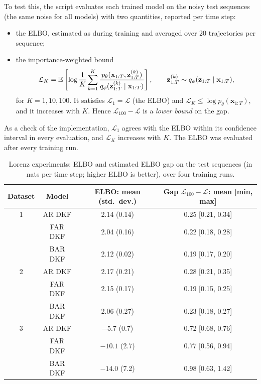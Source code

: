 To test this, the script  evaluates each trained
model on the noisy test sequences (the same noise for all models) with
two quantities, reported per time step:
\begin{itemize}
    \item the ELBO, estimated as during training and averaged over 20
    trajectories per sequence;
    \item the importance-weighted bound \cite{burda2016importance}
    \begin{equation*}
        \mathcal{L}_K = \mathbb{E}\left[\log \frac{1}{K} \sum_{k=1}^{K}
        \frac{p_\theta(\mathbf{x}_{1:T}, \mathbf{z}^{(k)}_{1:T})}
        {q_\phi(\mathbf{z}^{(k)}_{1:T} \mid \mathbf{x}_{1:T})}\right],
        \qquad \mathbf{z}^{(k)}_{1:T} \sim q_\phi(\mathbf{z}_{1:T} \mid
        \mathbf{x}_{1:T}),
    \end{equation*}
    for $K = 1, 10, 100$. It satisfies $\mathcal{L}_1 = \mathcal{L}$
    (the ELBO) and $\mathcal{L}_K \leq \log p_\theta(\mathbf{x}_{1:T})$,
    and it increases with $K$. Hence $\mathcal{L}_{100} - \mathcal{L}$ is
    a \emph{lower bound} on the gap.
\end{itemize}
As a check of the implementation, $\mathcal{L}_1$ agrees with the ELBO
within its confidence interval in every evaluation, and $\mathcal{L}_K$
increases with $K$. The ELBO was evaluated after every training run.

\begin{table}[ht!]
\centering
\small
\begin{tabular}{|c|c|c|c|}
\hline
Dataset & Model & ELBO: mean (std.\ dev.) &
Gap $\mathcal{L}_{100} - \mathcal{L}$: mean [min, max] \\
\hline
1 & AR DKF  & 2.14 (0.14)  & 0.25 [0.21, 0.34] \\
  & FAR DKF & 2.04 (0.16)  & 0.22 [0.18, 0.28] \\
  & BAR DKF & 2.12 (0.02)  & 0.19 [0.17, 0.20] \\ \hline
2 & AR DKF  & 2.17 (0.21)  & 0.28 [0.21, 0.35] \\
  & FAR DKF & 2.15 (0.17)  & 0.19 [0.15, 0.25] \\
  & BAR DKF & 2.06 (0.27)  & 0.23 [0.18, 0.27] \\ \hline
3 & AR DKF  & $-5.7$ (0.7)   & 0.72 [0.68, 0.76] \\
  & FAR DKF & $-10.1$ (2.7)  & 0.77 [0.56, 0.94] \\
  & BAR DKF & $-14.0$ (7.2)  & 0.98 [0.63, 1.42] \\ \hline
\end{tabular}
\caption{Lorenz experiments: ELBO and estimated ELBO gap on the test
sequences (in nats per time step; higher ELBO is better), over four
training runs.}
\label{tab:lorenz_elbo}
\end{table}

